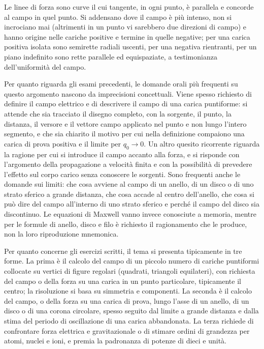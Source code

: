 \documentclass[11pt,a4paper]{article}
\begin{document}
Le linee di forza sono curve il cui tangente, in ogni punto, è parallela e concorde al campo in quel punto. Si addensano dove il campo è più intenso, non si incrociano mai (altrimenti in un punto vi sarebbero due direzioni di campo) e hanno origine nelle cariche positive e termine in quelle negative; per una carica positiva isolata sono semirette radiali uscenti, per una negativa rientranti, per un piano indefinito sono rette parallele ed equispaziate, a testimonianza dell'uniformità del campo.

Per quanto riguarda gli esami precedenti, le domande orali più frequenti su questo argomento nascono da imprecisioni concettuali. Viene spesso richiesto di definire il campo elettrico e di descrivere il campo di una carica puntiforme: si attende che sia tracciato il disegno completo, con la sorgente, il punto, la distanza, il versore e il vettore campo applicato nel punto e non lungo l'intero segmento, e che sia chiarito il motivo per cui nella definizione compaiono una carica di prova positiva e il limite per $q_0\to0$. Un altro quesito ricorrente riguarda la ragione per cui si introduce il campo accanto alla forza, e si risponde con l'argomento della propagazione a velocità finita e con la possibilità di prevedere l'effetto sul corpo carico senza conoscere le sorgenti. Sono frequenti anche le domande sui limiti: che cosa avviene al campo di un anello, di un disco o di uno strato sferico a grande distanza, che cosa accade al centro dell'anello, che cosa si può dire del campo all'interno di uno strato sferico e perché il campo del disco sia discontinuo. Le equazioni di Maxwell vanno invece conosciute a memoria, mentre per le formule di anello, disco e filo è richiesto il ragionamento che le produce, non la loro riproduzione mnemonica.

Per quanto concerne gli esercizi scritti, il tema si presenta tipicamente in tre forme. La prima è il calcolo del campo di un piccolo numero di cariche puntiformi collocate su vertici di figure regolari (quadrati, triangoli equilateri), con richiesta del campo o della forza su una carica in un punto particolare, tipicamente il centro; la risoluzione si basa su simmetria e componenti. La seconda è il calcolo del campo, o della forza su una carica di prova, lungo l'asse di un anello, di un disco o di una corona circolare, spesso seguito dal limite a grande distanza e dalla stima del periodo di oscillazione di una carica abbandonata. La terza richiede di confrontare forza elettrica e gravitazionale o di stimare ordini di grandezza per atomi, nuclei e ioni, e premia la padronanza di potenze di dieci e unità.
\end{document}
